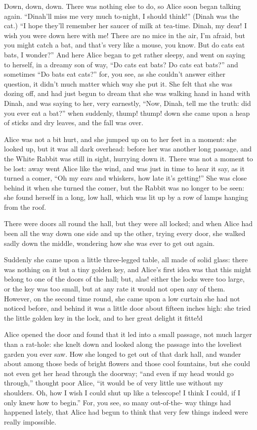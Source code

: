 \documentclass{l3proj}
\begin{document}
Down, down, down. There was nothing else to do, so Alice soon began talking
again. ``Dinah'll miss me very much to-night, I should think!'' (Dinah was
the cat.) ``I hope they'll remember her saucer of milk at tea-time. Dinah,
my dear! I wish you were down here with me! There are no mice in the air,
I'm afraid, but you might catch a bat, and that's very like a mouse, you
know. But do cats eat bats, I wonder?'' And here Alice began to get rather
sleepy, and went on saying to herself, in a dreamy son of way, ``Do cats eat
bats? Do cats eat bats?'' and sometimes ``Do bats eat cats?'' for, you see, as
she couldn't answer either question, it didn't much matter which way she
put it. She felt that she was dozing off, and had just begun to dream that
she was walking hand in hand with Dinah, and was saying to her, very
earnestly, ``Now, Dinah, tell me the truth: did you ever eat a bat?'' when
suddenly, thump! thump! down she came upon a heap of sticks and dry leaves,
and the fall was over.

Alice was not a bit hurt, and she jumped up on to her feet in a moment: she
looked up, but it was all dark overhead: before her was another long
passage, and the White Rabbit was still in sight, hurrying down it. There
was not a moment to be lost: away went Alice like the wind, and was just in
time to hear it say, as it turned a comer, ``Oh my ears and whiskers, how
late it's getting!'' She was close behind it when she turned the comer, but
the Rabbit was no longer to be seen: she found herself in a long, low hall,
which was lit up by a row of lamps hanging from the roof.

There were doors all round the hall, but they were all locked; and when
Alice had been all the way down one side and up the other, trying every
door, she walked sadly down the middle, wondering how she was ever to get
out again.

Suddenly she came upon a little three-legged table, all made of solid
glass: there was nothing on it but a tiny golden key, and Alice's first
idea was that this might belong to one of the doors of the hall; but, alas!
either the locks were too large, or the key was too small, but at any rate
it would not open any of them. However, on the second time round, she came
upon a low curtain she had not noticed before, and behind it was a little
door about fifteen inches high: she tried the little golden key in the
lock, and to her great delight it fitte!d



Alice opened the door and found that it led into a small passage, not much
larger than a rat-hole: she knelt down and looked along the passage into
the loveliest garden you ever saw. How she longed to get out of that dark
hall, and wander about among those beds of bright flowers and those cool
fountains, but she could not even get her head through the doorway; ``and
even if my head would go through,'' thought poor Alice, ``it would be of very
little use without my shoulders. Oh, how I wish I could shut up like a
telescope! I think I could, if I only knew how to begin.'' For, you see, so
many out-of-the- way things had happened lately, that Alice had begun to
think that very few things indeed were really impossible.
\end{document}
